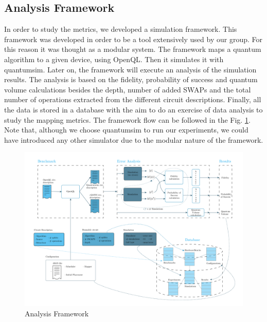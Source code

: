 \subsection{Analysis Framework}
\label{sec:org60b7659}
In order to study the metrics, we developed a simulation framework.
This framework was developed in order to be a tool extensively used by our group.
For this reason it was thought as a modular system.
The framework maps a quantum algorithm to a given device, using OpenQL.
Then it simulates it with quantumsim.
Later on, the framework will execute an analysis of the simulation results.
The analysis is based on the fidelity, probability of success and quantum volume calculations besides the depth, number of added SWAPs and the total number of operations extracted from the different circuit descriptions.
Finally, all the data is stored in a database with the aim to do an exercise of data analysis to study the mapping metrics.
The framework flow can be followed in the Fig. \ref{fig:general_error_framework}.
Note that, although we choose quantumsim to run our experiments, we could have introduced any other simulator due to the modular nature of the framework.



\begin{figure}

\begin{center}
\includegraphics[width=.9\linewidth]{figures/error_framework_diagram.png}
\end{center}


    \caption{Analysis Framework}
    \label{fig:general_error_framework}
\end{figure}

